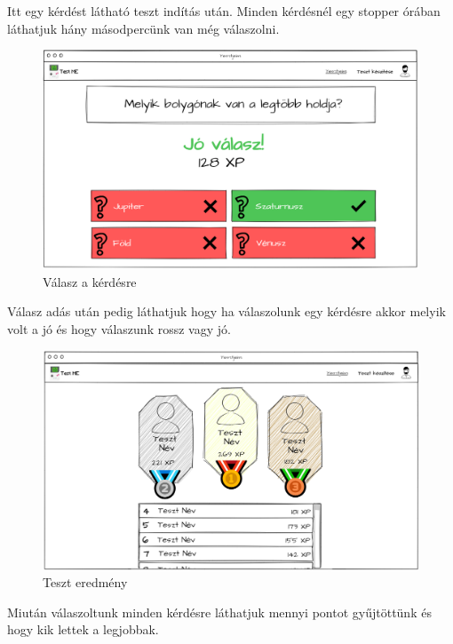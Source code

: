 Itt  egy kérdést látható teszt indítás után. Minden kérdésnél egy stopper órában láthatjuk hány másodpercünk van még válaszolni.

\begin{figure}[H]
    \centering
    \includegraphics[width=\linewidth]{images/test2_wireframe.png}
    \caption{Válasz a kérdésre}
    \label{fig:test_answer}
\end{figure}

Válasz adás után pedig láthatjuk  hogy ha válaszolunk egy kérdésre akkor melyik volt a jó és hogy válaszunk rossz vagy jó.

\begin{figure}[H]
    \centering
    \includegraphics[width=\linewidth]{images/test3_wireframe.png}
    \caption{Teszt eredmény}
    \label{fig:test_finished}
\end{figure}

Miután válaszoltunk minden kérdésre láthatjuk mennyi pontot gyűjtöttünk és hogy kik lettek a legjobbak. 


